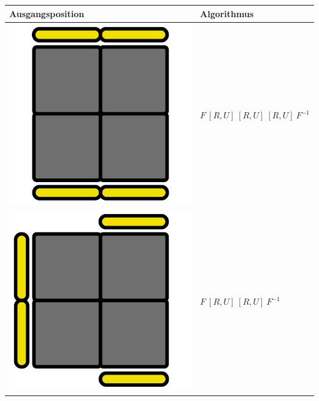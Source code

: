 \documentclass[12pt,a4paper, usenames, dvipsnames]{article}
\theoremstyle{mystyle}
\theoremstyle{definition}
\begin{document}
\begin{center}
\begin{tabular}{m{4cm} m{6cm}}
\toprule
Ausgangsposition & Algorithmus  \\
\midrule
\includegraphics[scale=0.08]{TOPVIEW1.png} & $F \ [ R,U ] \  [ R,U ] \  [ R,U ] \ F^{-1}$ \\
\includegraphics[scale=0.08]{TOPVIEW2.png} & $F \ [ R,U ] \  [ R,U ] \ F^{-1}$ \\
\bottomrule
\end{tabular}
\end{center}
\end{document}
